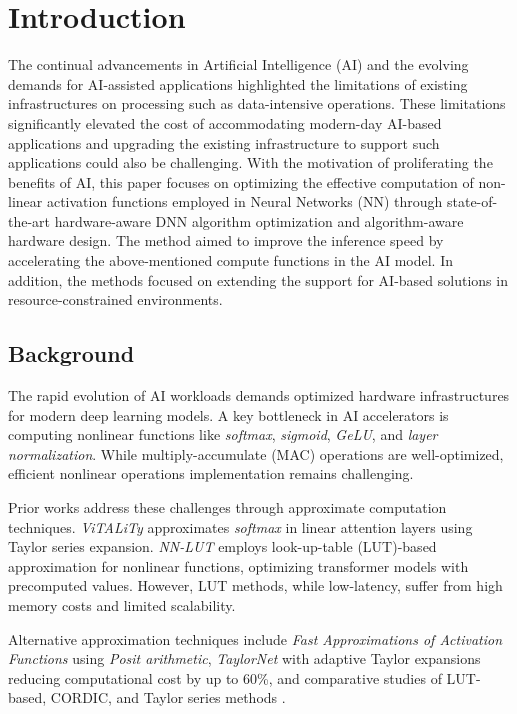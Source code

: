 \documentclass[conference,10pt]{IEEEtran}
\begin{document}
\section{Introduction}
    The continual advancements in Artificial Intelligence (AI) and the evolving demands for AI-assisted applications highlighted the limitations of existing infrastructures on processing such as data-intensive operations. These limitations significantly elevated the cost of accommodating modern-day AI-based applications and upgrading the existing infrastructure to support such applications could also be challenging. With the motivation of proliferating the benefits of AI, this paper focuses on optimizing the effective computation of non-linear activation functions employed in Neural Networks (NN) through state-of-the-art hardware-aware DNN algorithm optimization and algorithm-aware hardware design. The method aimed to improve the inference speed by accelerating the above-mentioned compute functions in the AI model. In addition, the methods focused on extending the support for AI-based solutions in resource-constrained environments.

\subsection{Background}
    The rapid evolution of AI workloads demands optimized hardware infrastructures for modern deep learning models. A key bottleneck in AI accelerators is computing nonlinear functions like \textit{softmax}, \textit{sigmoid}, \textit{GeLU}, and \textit{layer normalization}. While multiply-accumulate (MAC) operations are well-optimized, efficient nonlinear operations implementation remains challenging.
    
    Prior works address these challenges through approximate computation techniques. \textit{ViTALiTy} \cite{10071081} approximates \textit{softmax} in linear attention layers using Taylor series expansion. \textit{NN-LUT} \cite{10.1145/3489517.3530505} employs look-up-table (LUT)-based approximation for nonlinear functions, optimizing transformer models with precomputed values. However, LUT methods, while low-latency, suffer from high memory costs and limited scalability. 
    
    Alternative approximation techniques include \textit{Fast Approximations of Activation Functions} \cite{fastapprox2021posit} using \textit{Posit arithmetic}, \textit{TaylorNet} \cite{taylornet2020approx} with adaptive Taylor expansions reducing computational cost by up to 60\%, and comparative studies of LUT-based, CORDIC, and Taylor series methods \cite{approxactivation2022}.
    
\end{document}
